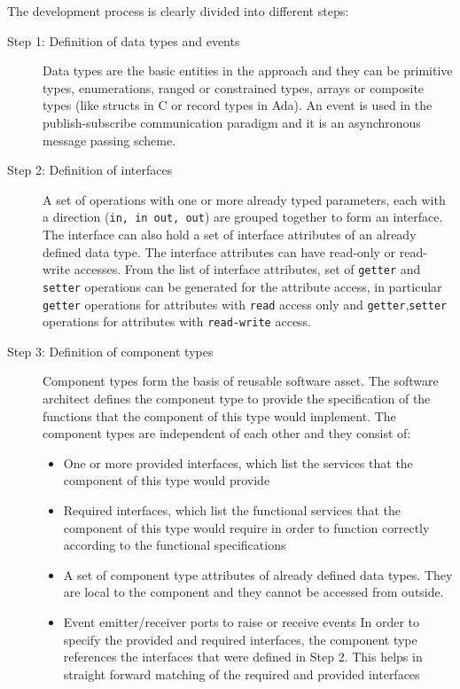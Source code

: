The development process is clearly divided into different steps:

\begin{description}
\item [Step 1: Definition of data types and events] Data types are the basic entities in the approach and they can be primitive types, enumerations, ranged or constrained types, arrays or composite types (like structs in C or record types in Ada). An event is used in the publish-subscribe communication paradigm and it is an asynchronous message passing scheme.

\item [Step 2: Definition of interfaces] A set of operations with one or more already typed parameters, each with a direction (\texttt{in, in out, out}) are grouped together to form an interface. The interface can also hold a set of interface attributes of an already defined data type. The interface attributes can have read-only or read-write accesses. From the list of interface attributes, set of \texttt{getter} and \texttt{setter} operations can be generated for the attribute access, in particular \texttt{getter} operations for attributes with \texttt{read} access only and \texttt{getter},\texttt{setter} operations for attributes with \texttt{read-write} access. 

\item [Step 3: Definition of component types] Component types form the basis of reusable software asset. The software architect defines the component type to provide the specification of the functions that the component of this type would implement. The component types are independent of each other and they consist of:
\begin{itemize}
\item One or more provided interfaces, which list the services that the component of this type would provide
\item Required interfaces, which list the functional services that the component of this type would require in order to function correctly according to the functional specifications
\item A set of component type attributes of already defined data types. They are local to the component and they cannot be accessed from outside.
\item Event emitter/receiver ports to raise or receive events
In order to specify the provided and required interfaces, the component type references the interfaces that were defined in Step 2. This helps in straight forward matching of the required and provided interfaces  
\end{itemize}


\end{description}
